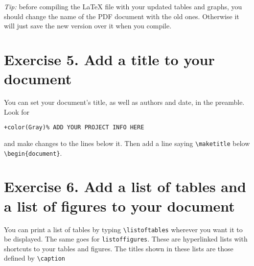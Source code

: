 \documentclass[12pts]{report}
\begin{document}
\begin{center}
	\textcolor{BurntOrange}{\emph{Tip:} before compiling the {\LaTeX} file with your updated tables and graphs, you should change the name of the PDF document with the old ones. Otherwise it will just save the new version over it when you compile.}
\end{center}

\section*{Exercise 5. Add a title to your document}
You can set your document's title, as well as authors and date, in the preamble. Look for
	\begin{center}
	\begin{Verbatim}[commandchars=+\(\)]
		+color(Gray)% ADD YOUR PROJECT INFO HERE 
	\end{Verbatim}
	\end{center}
and make changes to the lines below it. Then add a line saying \verb|\maketitle| below \verb|\begin{document}|.

\section*{Exercise 6. Add a list of tables and a list of figures to your document}
You can print a list of tables by typing \verb|\listoftables| wherever you want it to be displayed. The same goes for \verb|listoffigures|. These are hyperlinked lists with shortcuts to your tables and figures. The titles shown in these lists are those defined by \verb|\caption|
\end{document}
